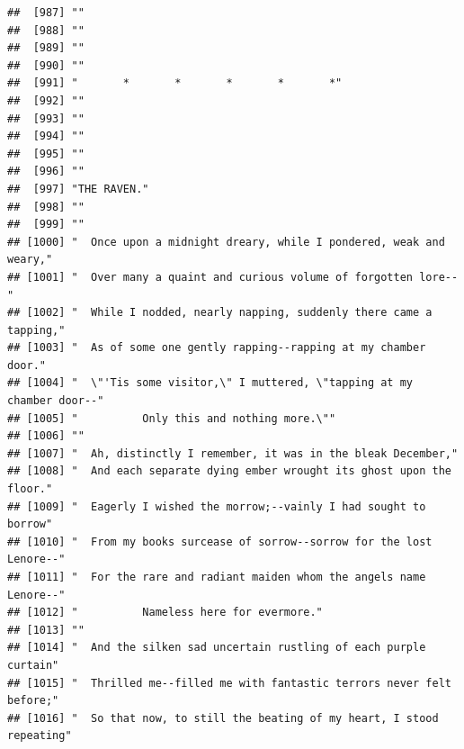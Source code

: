 \documentclass{article}\usepackage[]{graphicx}\usepackage[]{color}
\makeatletter
\newenvironment{kframe}{%
 \def\at@end@of@kframe{}%
 \ifinner\ifhmode%
  \def\at@end@of@kframe{\end{minipage}}%
  \begin{minipage}{\columnwidth}%
 \fi\fi%
 \def\FrameCommand##1{\hskip\@totalleftmargin \hskip-\fboxsep
 \colorbox{shadecolor}{##1}\hskip-\fboxsep
     \hskip-\linewidth \hskip-\@totalleftmargin \hskip\columnwidth}%
 \MakeFramed {\advance\hsize-\width
   \@totalleftmargin\z@ \linewidth\hsize
   \@setminipage}}%
 {\par\unskip\endMakeFramed%
 \at@end@of@kframe}
\newenvironment{knitrout}{}{} %
\makeatother
\begin{document}
\begin{knitrout}
\begin{kframe}
\begin{verbatim}
##  [987] ""                                                                            
##  [988] ""                                                                            
##  [989] ""                                                                            
##  [990] ""                                                                            
##  [991] "       *       *       *       *       *"                                    
##  [992] ""                                                                            
##  [993] ""                                                                            
##  [994] ""                                                                            
##  [995] ""                                                                            
##  [996] ""                                                                            
##  [997] "THE RAVEN."                                                                  
##  [998] ""                                                                            
##  [999] ""                                                                            
## [1000] "  Once upon a midnight dreary, while I pondered, weak and weary,"            
## [1001] "  Over many a quaint and curious volume of forgotten lore--"                 
## [1002] "  While I nodded, nearly napping, suddenly there came a tapping,"            
## [1003] "  As of some one gently rapping--rapping at my chamber door."                
## [1004] "  \"'Tis some visitor,\" I muttered, \"tapping at my chamber door--"         
## [1005] "          Only this and nothing more.\""                                     
## [1006] ""                                                                            
## [1007] "  Ah, distinctly I remember, it was in the bleak December,"                  
## [1008] "  And each separate dying ember wrought its ghost upon the floor."           
## [1009] "  Eagerly I wished the morrow;--vainly I had sought to borrow"               
## [1010] "  From my books surcease of sorrow--sorrow for the lost Lenore--"            
## [1011] "  For the rare and radiant maiden whom the angels name Lenore--"             
## [1012] "          Nameless here for evermore."                                       
## [1013] ""                                                                            
## [1014] "  And the silken sad uncertain rustling of each purple curtain"              
## [1015] "  Thrilled me--filled me with fantastic terrors never felt before;"          
## [1016] "  So that now, to still the beating of my heart, I stood repeating"          

\end{verbatim}
\end{kframe}
\end{knitrout}
\end{document}
